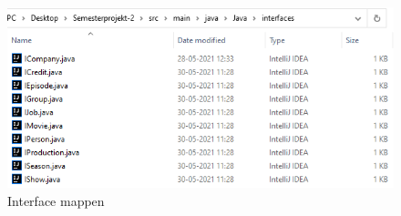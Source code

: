 \begin{figure}[H]
    \centering
    \includegraphics{images/interfaces.PNG}
    \caption{Interface mappen}
    \label{fig:my_label}
\end{figure}
